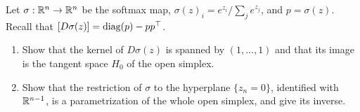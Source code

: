 \begin{notechapter}
\begin{exercise}\label{submanifolds:exr:9}
Let $\sigma:\mathbb{R}^n\to\mathbb{R}^n$ be the softmax map,
$\sigma(z)_i = e^{z_i}/\sum_je^{z_j}$, and $p = \sigma(z)$. Recall that
$[D\sigma(z)] = \operatorname{diag}(p) - pp^\top$.
\begin{enumerate}[nosep]
  \item Show that the kernel of $D\sigma(z)$ is spanned by
        $(1,\dots,1)$ and that its image is the tangent space $H_0$ of
        the open simplex.
  \item Show that the restriction of $\sigma$ to the hyperplane
        $\{z_n = 0\}$, identified with $\mathbb{R}^{n-1}$, is a parametrization
        of the whole open simplex, and give its inverse.
\end{enumerate}
\end{exercise}
\end{notechapter}
